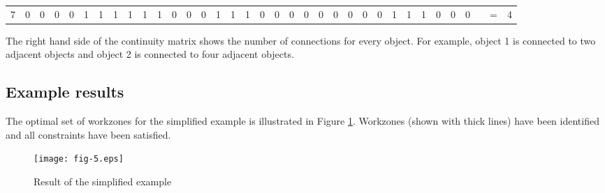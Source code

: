 \documentclass[a4paper,3p,times,authoryear]{elsarticle}
\begin{document}
\begin{table}[H]
{\begin{tabular}{|l|l|l|l|l|l|l|l|l|l|l|l|l|l|l|l|l|l|l|l|l|l|l|l|l|l|l|l|l|l|l|llll|}
\multicolumn{1}{|c|}{7} & \multicolumn{1}{c|}{0} & \multicolumn{1}{c|}{0} & \multicolumn{1}{c|}{0} & \multicolumn{1}{c|}{0} & \multicolumn{1}{c|}{\cellcolor{blue!25}1} & \multicolumn{1}{c|}{\cellcolor{blue!25}1} & \multicolumn{1}{c|}{\cellcolor{blue!25}1} & \multicolumn{1}{c|}{\cellcolor{blue!25}1} & \multicolumn{1}{c|}{\cellcolor{blue!25}1} & \multicolumn{1}{c|}{\cellcolor{blue!25}1} & \multicolumn{1}{c|}{0} & \multicolumn{1}{c|}{0} & \multicolumn{1}{c|}{0} & \multicolumn{1}{c|}{\cellcolor{blue!25}1} & \multicolumn{1}{c|}{\cellcolor{blue!25}1} & \multicolumn{1}{c|}{\cellcolor{blue!25}1} & \multicolumn{1}{c|}{0} & \multicolumn{1}{c|}{0} & \multicolumn{1}{c|}{0} & \multicolumn{1}{c|}{0} & \multicolumn{1}{c|}{0} & \multicolumn{1}{c|}{0} & \multicolumn{1}{c|}{0} & \multicolumn{1}{c|}{0} & \multicolumn{1}{c|}{0} & \multicolumn{1}{c|}{\cellcolor{blue!25}1} & \multicolumn{1}{c|}{\cellcolor{blue!25}1} & \multicolumn{1}{c|}{\cellcolor{blue!25}1} & \multicolumn{1}{c|}{0} & \multicolumn{1}{c|}{0} & \multicolumn{1}{c}{0} & \multicolumn{1}{c}{} & \multicolumn{1}{c}{=} & \multicolumn{1}{c|}{\cellcolor{blue!25}4} \\ 
\cline{1-32}\cline{34-35}
\end{tabular}}
\end{table}
%
The right hand side of the continuity matrix shows the number of connections for
every object. For example, object 1 is connected to two adjacent objects and
object 2 is connected to four adjacent objects.
%
\subsection{Example results}
%
The optimal set of workzones for the simplified example is illustrated in Figure
\ref{fig:5}. Workzones (shown with thick lines) have been identified and all
constraints have been satisfied.
%
\begin{figure}[h]
\begin{center}
\texttt{[image: fig-5.eps]}
\caption{Result of the simplified example}\label{fig:5}
\end{center}
\end{figure}
%
\end{document}
